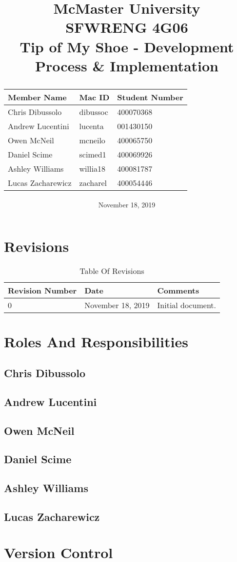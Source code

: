 \documentclass[12pt, titlepage]{article}
\title{
McMaster University\\
SFWRENG 4G06\\
\bigskip\bigskip\bigskip
{\bf Tip of My Shoe - Development Process \& Implementation\\}
\bigskip\bigskip\bigskip\bigskip
\begin{table}[h!]
\begin{center}
\begin{tabular}{|p{5cm}|p{5cm}|p{5cm}|}
	\hline
	\bf Member Name & \bf Mac ID & \bf Student Number\\
	\hline
	\hline
	Chris Dibussolo & dibussoc & 400070368\\
	\hline
    Andrew Lucentini & lucenta & 001430150\\
    \hline
	Owen McNeil & mcneilo & 400065750 \\
	\hline
	Daniel Scime & scimed1 & 400069926\\
	\hline
    Ashley Williams & willia18 & 400081787\\
	\hline
    Lucas Zacharewicz & zacharel & 400054446\\
	\hline
\end{tabular}
\end{center}
\end{table}
\date{November 18, 2019}
}
\begin{document}
\maketitle
\tableofcontents
\newpage
\listoffigures
\listoftables


\section{Revisions}
\begin{table}[!htbp]
\begin{center}
\begin{tabular}{|p{5cm}|p{5cm}|p{5cm}|}
	\hline
	\bf Revision Number & \bf Date & \bf Comments\\
	\hline
	\hline
    0 & November 18, 2019 & Initial document.\\
	\hline
\end{tabular}
\caption{Table Of Revisions}
\end{center}
\end{table}

\section{Roles And Responsibilities}
\subsection{Chris Dibussolo}
\subsection{Andrew Lucentini}
\subsection{Owen McNeil}
\subsection{Daniel Scime}
\subsection{Ashley Williams}
\subsection{Lucas Zacharewicz}

\section{Version Control}
\end{document}
